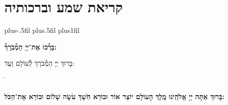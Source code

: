 \documentclass[twoside, openany, parskip=half, 11pt]{book}
\begin{document}
\chapter[שחרית לחול]{קריאת שמע וברכותיה}
\newcommand{\barachu}{
\begin{minipage}{0.8\textwidth}
\leftskip=0pt plus-.5fil
\rightskip=0pt plus.5fil
\parfillskip=0pt plus1fil
\begin{large}

\shatz
\begin{Large}\textbf{בָּרְ֯כוּ אֶת־יְיָ הַמְ֯בֹרָךְ֯:}\end{Large}
\end{large}

\vspace{12pt}

\shatzvkahal
בָּרוּךְ יְיָ הַמְ֯בֹרָךְ לְ֯עוֹלָם וָעֶד:
\end{minipage}
ֺֺ%

%
}


\barachu

\textbf{
בָּרוּךְ אַתָּה יְיָ אֱלֹהֵֽינוּ מֶֽלֶךְ הָעוֹלָם יוֹצֵר אוֹר וּבוֹרֵא חֹֽשֶׁךְ עֹשֶׂה שָׁלוֹם וּבוֹרֵא אֶת־הַכֹּל:
}

\newcommand{\hameir}{
\firstword{הַמֵּאִיר}
לָאָֽרֶץ וְ֯לַדָּרִים עָלֶֽיהָ בְּ֯רַחֲמִים וּבְטוּבוֹ מְ֯חַדֵּשׁ בְּ֯כׇל־יוֹם תָּמִיד מַעֲשֵׂה בְ֯רֵאשִׁית: \source{תהלים קד}מָה־רַבּ֬וּ מַעֲשֶׂ֨יךָ ׀ יְיָ֗ כֻּ֭לָּם בְּ֯חׇכְמָ֣ה עָשִׂ֑יתָ מָלְ֯אָ֥ה הָ֝אָ֗רֶץ קִנְיָנֶֽךָ׃ הַמֶּֽלֶךְ הַמְ֯רוֹמָם לְ֯בַדּוֹ מֵאָז הַמְ֯שֻׁבָּח וְ֯הַמְ֯פֹאָר וְ֯הַמִּתְנַשֵּׂא מִימוֹת עוֹלָם: אֱלֹהֵי עוֹלָם בְּ֯רַחֲמֶיךָ הָרַבִּים רַחֵם עָלֵינוּ אֲדוֹן עֻזֵּֽנוּ צוּר מִשְׂגַּבֵּנוּ מָגֵן יִשְׁעֵֽנוּ מִשְׂגָּב בַּעֲדֵֽנוּ: אֵ֗ל בָּ֗רוּךְ גְּ֯֗דוֹל דֵּ֗עָה הֵ֗כִין וּ֗פָעַל זׇׇׇׇׇׇ֗הֳרֵי חַ֗מָּה ט֗וֹב יָ֗צַר כָּ֗בוֹד לִ֗שְׁמוֹ מְ֯֗אוֹרוֹת נָ֗תַן סְ֯֗בִיבוֹת עֻ֗זּוֹ פִּ֗נּוֹת צְ֯֗בָאָיו קְ֯֗דוֹשִׁים ר֗וֹמֲמֵי שַׁ֗דַּי תָּ֗מִיד מְ֯סַפְּ֯רִים כְּ֯בוֹד־אֵל וּקְדֻשָׁתוֹ: תִּתְבָּרַךְ יְיָ אֱלֹהֵֽינוּ עַל־שֶׁבַח מַעֲשֵׂי יָדֶֽיךָ וְ֯עַל־מְ֯אֽוֹרֵי אוֹר שֶׁעָשִֽׂיתָ יְ֯פָאֲרֽוּךָ סֶּֽלָה:
}
\end{document}
